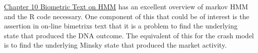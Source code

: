 \documentclass[12pt, a4paper, oneside]{article} %
\begin{document}
\begin{itemize}
\end{itemize}

\href{http://a-little-book-of-r-for-bioinformatics.readthedocs.org/en/latest/src/chapter10.html}{Chapter 10 Biometric Text on HMM}
has an excellent overview of markov HMM and the R code necessary. One component of this that could be of interest is the assertion in on-line bimetrixs text that it is a problem to find the underlying state that produced the DNA outcome.  The equivalent of this for the crash model is to find the underlying Minsky state that produced the market activity.


\end{document}
